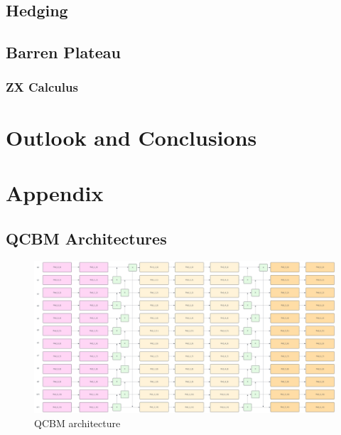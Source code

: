 \documentclass[12pt]{article}
\numberwithin{equation}{section}
\begin{document}
\newpage
\subsection{Hedging}

\subsection{Barren Plateau}

\subsubsection{ZX Calculus}

\clearpage 

\section{Outlook and Conclusions}


\clearpage
\section{Appendix}
\subsection{QCBM Architectures}

\begin{figure}[h!]
    \centering
    \includegraphics[scale=0.3, angle=270, width=\textwidth-209]{qcbm1.png}
    \caption{QCBM architecture}
\end{figure}
\clearpage


\printbibliography
\end{document}
